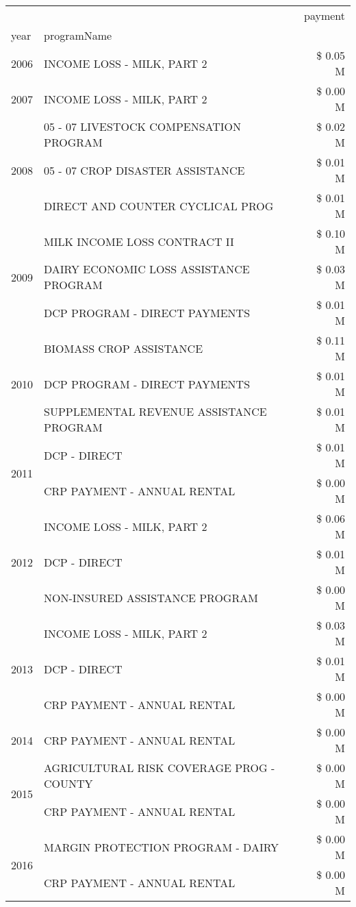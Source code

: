 \begin{tabular}{llr}
\toprule
 &  & payment \\
year & programName &  \\
\midrule
2006 & INCOME LOSS - MILK, PART 2 & \$ 0.05 M \\
\cline{1-3}
2007 & INCOME LOSS - MILK, PART 2 & \$ 0.00 M \\
\cline{1-3}
\multirow[t]{3}{*}{2008} & 05 - 07 LIVESTOCK COMPENSATION PROGRAM & \$ 0.02 M \\
 & 05 - 07 CROP DISASTER ASSISTANCE & \$ 0.01 M \\
 & DIRECT AND COUNTER CYCLICAL PROG & \$ 0.01 M \\
\cline{1-3}
\multirow[t]{3}{*}{2009} & MILK INCOME LOSS CONTRACT II & \$ 0.10 M \\
 & DAIRY ECONOMIC LOSS ASSISTANCE PROGRAM & \$ 0.03 M \\
 & DCP PROGRAM - DIRECT PAYMENTS & \$ 0.01 M \\
\cline{1-3}
\multirow[t]{3}{*}{2010} & BIOMASS CROP ASSISTANCE & \$ 0.11 M \\
 & DCP PROGRAM - DIRECT PAYMENTS & \$ 0.01 M \\
 & SUPPLEMENTAL REVENUE ASSISTANCE PROGRAM & \$ 0.01 M \\
\cline{1-3}
\multirow[t]{2}{*}{2011} & DCP - DIRECT & \$ 0.01 M \\
 & CRP PAYMENT - ANNUAL RENTAL & \$ 0.00 M \\
\cline{1-3}
\multirow[t]{3}{*}{2012} & INCOME LOSS - MILK, PART 2 & \$ 0.06 M \\
 & DCP - DIRECT & \$ 0.01 M \\
 & NON-INSURED ASSISTANCE PROGRAM & \$ 0.00 M \\
\cline{1-3}
\multirow[t]{3}{*}{2013} & INCOME LOSS - MILK, PART 2 & \$ 0.03 M \\
 & DCP - DIRECT & \$ 0.01 M \\
 & CRP PAYMENT - ANNUAL RENTAL & \$ 0.00 M \\
\cline{1-3}
2014 & CRP PAYMENT - ANNUAL RENTAL & \$ 0.00 M \\
\cline{1-3}
\multirow[t]{2}{*}{2015} & AGRICULTURAL RISK COVERAGE PROG - COUNTY & \$ 0.00 M \\
 & CRP PAYMENT - ANNUAL RENTAL & \$ 0.00 M \\
\cline{1-3}
\multirow[t]{3}{*}{2016} & MARGIN PROTECTION PROGRAM - DAIRY & \$ 0.00 M \\
 & CRP PAYMENT - ANNUAL RENTAL & \$ 0.00 M \\

\end{tabular}

